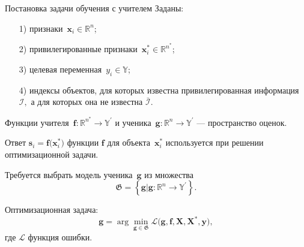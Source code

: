 \documentclass[10pt,pdf,hyperref={unicode}]{beamer}
\begin{document}
\begin{frame}{Постановка задачи обучения с учителем}
\justifying
Заданы:
\begin{enumerate}
    \item[1)] признаки~$\mathbf{x}_i \in \mathbb{R}^{n}$;
    \item[2)] привилегированные признаки~$\mathbf{x}^*_i \in \mathbb{R}^{n^*}$;
    \item[3)] целевая переменная~$y_i \in \mathbb{Y}$;
    \item[4)] индексы объектов, для которых известна привилегированная информация $\mathcal{I},$ а для которых она не известна $\bar{\mathcal{I}}$.
\end{enumerate}

\bigskip

Функции учителя~$\mathbf{f}:\mathbb{R}^{n^*} \to \mathbb{Y}^\prime$ и ученика~$\mathbf{g}:\mathbb{R}^{n} \to \mathbb{Y}^\prime$ --- пространство оценок.

Ответ $\mathbf{s}_i = \mathbf{f}\bigr(\mathbf{x}_i^*\bigr)$ функции $\mathbf{f}$ для объекта~$\mathbf{x}^*_i$ используется при решении оптимизационной задачи.

\bigskip

Требуется выбрать модель ученика~$\mathbf{g}$ из множества
\[
	\mathfrak{G} = \left\{\mathbf{g}| \mathbf{g}:\mathbb{R}^{n} \to \mathbb{Y}^\prime\right\}.
\]

Оптимизационная задача:
\[
	\mathbf{g} = \arg\min_{\mathbf{g} \in \mathfrak{G}} \mathcal{L}\bigr(\mathbf{g}, \mathbf{f}, \mathbf{X}, \mathbf{X}^{*}, \mathbf{y}\bigr),
\]
где $\mathcal{L}$ функция ошибки.
\end{frame}
\end{document}
